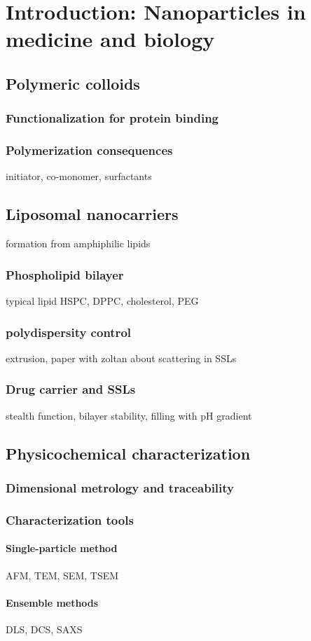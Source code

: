 \chapter{Introduction: Nanoparticles in medicine and biology}
\label{chap:introduction}

\section{Polymeric colloids}
\subsection{Functionalization for protein binding}

\subsection{Polymerization consequences}
initiator, co-monomer, surfactants

\section{Liposomal nanocarriers}
formation from amphiphilic lipids
\subsection{Phospholipid bilayer}
typical lipid HSPC, DPPC, cholesterol, PEG

\subsection{polydispersity control}
extrusion, paper with zoltan about scattering in SSLs

\subsection{Drug carrier and SSLs}
stealth function, bilayer stability, filling with pH gradient

\section{Physicochemical characterization}
\subsection{Dimensional metrology and traceability}

\subsection{Characterization tools}
\subsubsection{Single-particle method}
AFM, TEM, SEM, TSEM

\subsubsection{Ensemble methods}
DLS, DCS, SAXS


